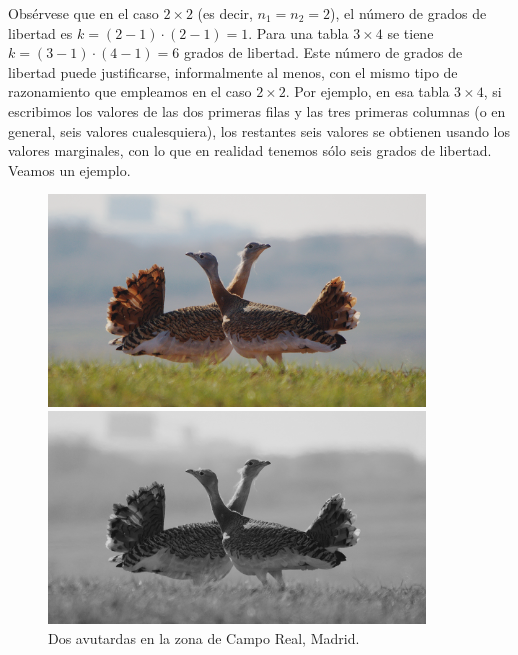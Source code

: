 Obsérvese que en el caso $2\times 2$ (es decir, $n_1=n_2=2$), el número de grados de libertad es
$k=(2-1)\cdot(2-1)=1$. Para una tabla $3\times 4$ se tiene $k=(3-1)\cdot(4-1)=6$ grados de
libertad. Este número de grados de libertad puede justificarse, informalmente al menos, con el
mismo tipo de razonamiento que empleamos en el caso $2\times 2$. Por ejemplo, en esa tabla $3\times
4$, si escribimos los valores de las dos primeras filas y las tres primeras columnas (o en general,
seis valores cualesquiera), los restantes seis valores se obtienen usando los valores marginales,
con lo que en realidad tenemos sólo seis grados de libertad. Veamos un ejemplo.

\begin{figure}[h!]
\begin{center}
\begin{enColor}
\includegraphics[width=10cm]{../fig/Cap12-Avutardas.png}
\end{enColor}
\begin{bn}
\includegraphics[width=10cm]{../fig/Cap12-Avutardas-bn.png}
\end{bn}
  \caption{Dos avutardas en la zona de Campo Real, Madrid.}
  \label{cap12:Fig:FotoAvutardas}
\end{center}
\end{figure}


